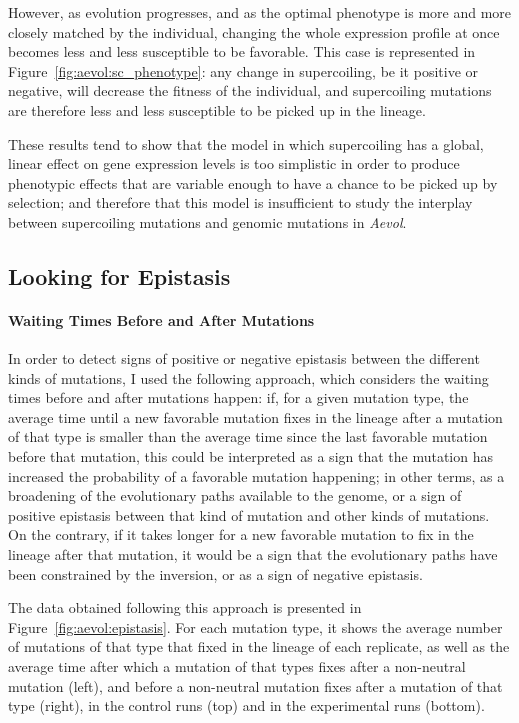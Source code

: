 However, as evolution progresses, and as the optimal phenotype is more and more closely matched by the individual, changing the whole expression profile at once becomes less and less susceptible to be favorable.
This case is represented in Figure~\ref{fig:aevol:sc_phenotype}: any change in supercoiling, be it positive or negative, will decrease the fitness of the individual, and supercoiling mutations are therefore less and less susceptible to be picked up in the lineage.

These results tend to show that the model in which supercoiling has a global, linear effect on gene expression levels is too simplistic in order to produce phenotypic effects that are variable enough to have a chance to be picked up by selection; and therefore that this model is insufficient to study the interplay between supercoiling mutations and genomic mutations in \emph{Aevol}.

\subsection{Looking for Epistasis}

\paragraph{Waiting Times Before and After Mutations}
In order to detect signs of positive or negative epistasis between the different kinds of mutations, I used the following approach, which considers the waiting times before and after mutations happen:
if, for a given mutation type, the average time until a new favorable mutation fixes in the lineage after a mutation of that type is smaller than the average time since the last favorable mutation before that mutation, this could be interpreted as a sign that the mutation has increased the probability of a favorable mutation happening; in other terms, as a broadening of the evolutionary paths available to the genome, or a sign of positive epistasis between that kind of mutation and other kinds of mutations.
On the contrary, if it takes longer for a new favorable mutation to fix in the lineage after that mutation, it would be a sign that the evolutionary paths have been constrained by the inversion, or as a sign of negative epistasis.

The data obtained following this approach is presented in Figure~\ref{fig:aevol:epistasis}.
For each mutation type, it shows the average number of mutations of that type that fixed in the lineage of each replicate, as well as the average time after which a mutation of that types fixes after a non-neutral mutation (left), and before a non-neutral mutation fixes after a mutation of that type (right), in the control runs (top) and in the experimental runs (bottom).

